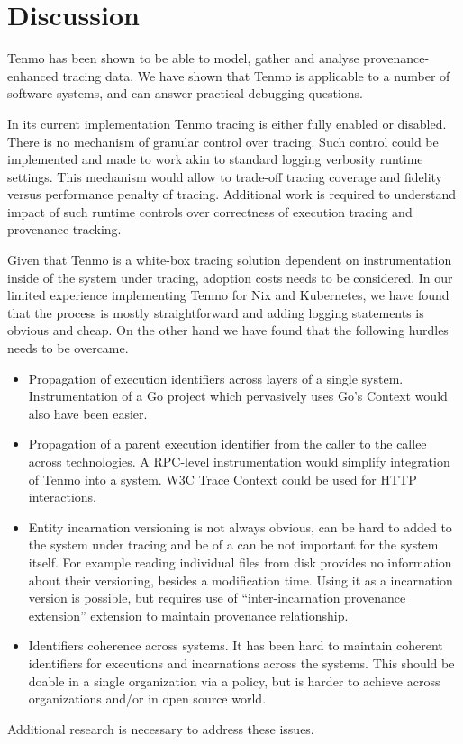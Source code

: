 \bigskip

\section{Discussion}

Tenmo has been shown to be able to model, gather and analyse provenance-enhanced tracing data. We have shown that Tenmo is applicable to a number of software systems, and can answer practical debugging questions.

In its current implementation Tenmo tracing is either fully enabled or disabled. There is no mechanism of granular control over tracing. Such control could be implemented and made to work akin to standard logging verbosity runtime settings. This mechanism would allow to trade-off tracing coverage and fidelity versus performance penalty of tracing. Additional work is required to understand impact of such runtime controls over correctness of execution tracing and provenance tracking.

Given that Tenmo is a white-box tracing solution dependent on instrumentation inside of the system under tracing, adoption costs needs to be considered. In our limited experience implementing Tenmo for Nix and Kubernetes, we have found that the process is mostly straightforward and adding logging statements is obvious and cheap. On the other hand we have found that the following hurdles needs to be overcame.
%
\begin{itemize}[nosep]
    \item Propagation of execution identifiers across layers of a single system. Instrumentation of a Go project which pervasively uses Go's Context would also have been easier.
    \item Propagation of a parent execution identifier from the caller to the callee across technologies. A RPC-level instrumentation would simplify integration of Tenmo into a system. W3C Trace Context could be used for HTTP interactions. 
    \item Entity incarnation versioning is not always obvious, can be hard to added to the system under tracing and be of a can be not important for the system itself. For example reading individual files from disk provides no information about their versioning, besides a modification time. Using it as a incarnation version is possible, but requires use of ``inter-incarnation provenance extension'' extension to maintain provenance relationship.
    \item Identifiers coherence across systems. It has been hard to maintain coherent identifiers for executions and incarnations across the systems. This should be doable in a single organization via a policy, but is harder to achieve across organizations and/or in open source world.
\end{itemize}
%
Additional research is necessary to address these issues.

